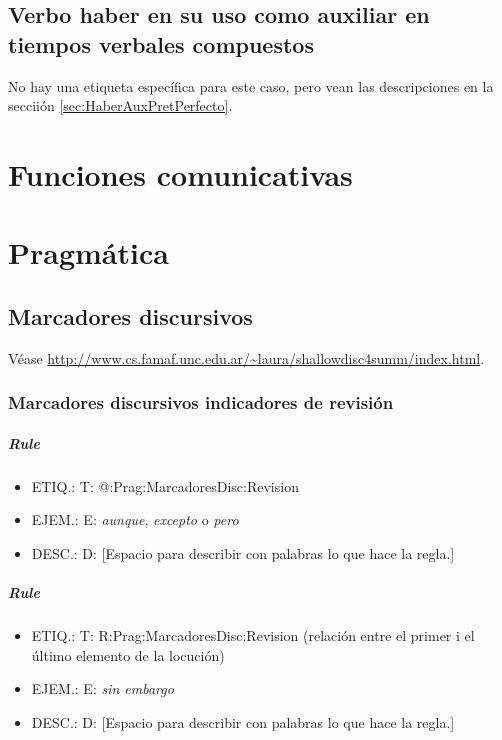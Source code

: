 \documentclass[11pt]{report}
\begin{document}
\section{Verbo haber en su uso como auxiliar en tiempos verbales compuestos}
No hay una etiqueta específica para este caso, pero vean las descripciones en la secciión \ref{sec:HaberAuxPretPerfecto}. 

\chapter{Funciones comunicativas}
\chapter{Pragmática}
\section{Marcadores discursivos}
Véase \url{http://www.cs.famaf.unc.edu.ar/~laura/shallowdisc4summ/index.html}.

\subsection{Marcadores discursivos indicadores de revisión}
\paragraph*{Rule}
\begin{itemize}
\item ETIQ.:  T: @:Prag:MarcadoresDisc:Revision
\item EJEM.:  E: \emph{aunque}, \emph{excepto} o \emph{pero}
\item DESC.:  D: [Espacio para describir con palabras lo que hace la regla.]
\end{itemize}

\paragraph*{Rule}
\begin{itemize}
\item ETIQ.:  T: R:Prag:MarcadoresDisc:Revision (relación entre el primer i el último elemento de la locución)
\item EJEM.:  E: \emph{sin embargo}
\item DESC.:  D: [Espacio para describir con palabras lo que hace la regla.]
\end{itemize}
\end{document}
